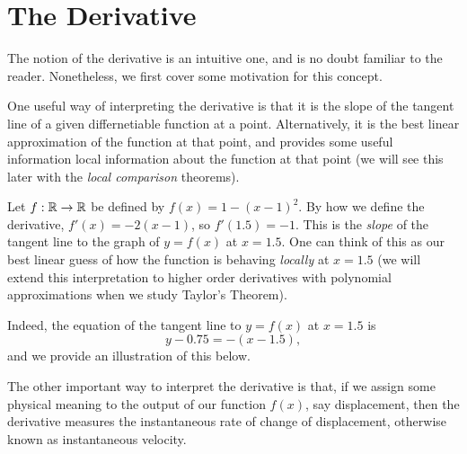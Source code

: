 \documentclass[../analysis1.tex]{subfiles}
\begin{document}
\chapter{The Derivative}

The notion of the derivative is an intuitive one, and is no doubt familiar to the reader. Nonetheless, we first cover some motivation for this concept.


One useful way of interpreting the derivative is that it is the slope of the tangent line of a given differnetiable function at a point. Alternatively, it is the best linear approximation of the function at that point, and provides some useful information local information about the function at that point (we will see this later with the \textit{local comparison} theorems).

\begin{example}
    Let $f:\mathbb{R}\to\mathbb{R}$ be defined by $f(x)=1-(x-1)^2$. By how we define the derivative, $f'(x)=-2(x-1)$, so $f'(1.5)=-1$. This is the \textit{slope} of the tangent line to the graph of $y=f(x)$ at $x=1.5$. One can think of this as our best linear guess of how the function is behaving \textit{locally} at $x=1.5$ (we will extend this interpretation to higher order derivatives with polynomial approximations when we study Taylor's Theorem).

    Indeed, the equation of the tangent line to $y=f(x)$ at $x=1.5$ is \[y-0.75=-(x-1.5),\]
    and we provide an illustration of this below.
    \begin{center}
    \end{center}
\end{example}

The other important way to interpret the derivative is that, if we assign some physical meaning to the output of our function $f(x)$, say displacement, then the derivative measures the instantaneous rate of change of displacement, otherwise known as instantaneous velocity.
\end{document}
